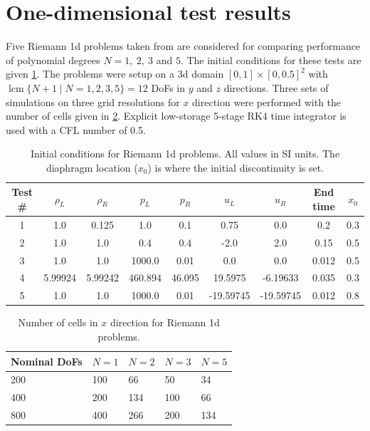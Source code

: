 \documentclass[a4paper,11pt,oneside]{article}
\newcommand{\citear}[1]{\citeauthor{#1} \cite{#1}} %
\DeclareMathOperator{\lcm}{lcm} %
\begin{document}
\section{One-dimensional test results}
\label{sec:1d_tests}

Five Riemann 1d problems taken from \citear{toro2009} are considered for comparing performance of polynomial degrees $N=1,\ 2,\ 3$ and $5$. The initial conditions for these tests are given \cref{tab:ic_riemann1d}. The problems were setup on a 3d domain $[0,1] \times [0,0.5]^2$ with $\lcm \{N+1 \mid N=1,2,3,5\}=12$ DoFs in $y$ and $z$ directions. Three sets of simulations on three grid resolutions for $x$ direction were performed with the number of cells given in \cref{tab:nx_riemann1d}. Explicit low-storage 5-stage RK4 time integrator \cite{kennedyCarpenterLewis2000} is used with a CFL number of 0.5.

\begin{table}[htbp]
	\centering
	\caption{Initial conditions for Riemann 1d problems. All values in SI units. The diaphragm location ($x_0$) is where the initial discontinuity is set.}
	\label{tab:ic_riemann1d}
	\begin{tabular}{c c c c c c c c c}
		\toprule
		Test \# & $\rho_L$ & $\rho_R$ & $p_L$ & $p_R$ & $u_L$ & $u_R$ & End time & $x_0$ \\ \midrule
		1 & 1.0 & 0.125 & 1.0 & 0.1 & 0.75 & 0.0 & 0.2 & 0.3 \\
		2 & 1.0 & 1.0 & 0.4 & 0.4 & -2.0 & 2.0 & 0.15 & 0.5 \\
		3 & 1.0 & 1.0 & 1000.0 & 0.01 & 0.0 & 0.0 & 0.012 & 0.5 \\
		4 & 5.99924 & 5.99242 & 460.894 & 46.095 & 19.5975 & -6.19633 & 0.035 & 0.3 \\
		5 & 1.0 & 1.0 & 1000.0 & 0.01 & -19.59745 & -19.59745 & 0.012 & 0.8 \\
		\bottomrule
	\end{tabular}
\end{table}

\begin{table}[htbp]
\centering
\caption{Number of cells in $x$ direction for Riemann 1d problems.}
\label{tab:nx_riemann1d}
\begin{tabular}{lllll}
	\toprule
	Nominal DoFs & $N=1$ & $N=2$ & $N=3$ & $N=5$\\
	\midrule
	200 & 100 & 66 & 50 & 34 \\
	400 & 200 & 134 & 100 & 66 \\
	800 & 400 & 266 & 200 & 134 \\
	\bottomrule
\end{tabular}
\end{table}
\end{document}
